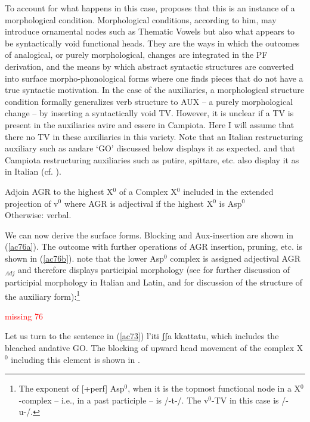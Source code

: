 \documentclass[output=paper]{langscibook}
\begin{document}
{To account for what happens in this case, \cite{calabrese2019a, calabrese2020a} proposes  that this is an instance of a morphological condition. Morphological conditions, according to him, may introduce ornamental nodes such as Thematic Vowels but also what appears to be syntactically void functional heads. They are the ways in which the outcomes of analogical, or purely morphological, changes are integrated in the PF derivation, and the means by which abstract syntactic structures are converted into surface morpho-phonological forms where one finds pieces that do not have a true syntactic motivation. In the case of the auxiliaries, a morphological structure condition formally generalizes verb structure to AUX --  a purely morphological change  --  by inserting a syntactically void TV. However, it is unclear if a TV is present in the auxiliaries avire and essere in Campiota. Here I will assume that there no TV in these auxiliaries in this variety.  Note that an Italian restructuring auxiliary such as andare ‘GO’ discussed below displays it as expected. and that Campiota restructuring auxiliaries such as putire, spittare, etc. also display it as in Italian (cf. ).}

\ea \label{ac75} Adjoin AGR to the highest X$^0$ of a Complex X$^0$ included in the extended projection of v$^0$
    \ea \label{ac75a}where AGR is adjectival if the highest X$^0$ is Asp$^0$\\
        Otherwise:
    \ex \label{ac75b}verbal.
   \z 
\z

We can now derive the surface forms. Blocking and Aux-insertion are shown in (\ref{ac76a}).  The outcome with further operations of AGR insertion, pruning, etc. is shown in (\ref{ac76b}).  note that the lower Asp$^0$ complex is assigned adjectival AGR$_{Adj}$ and therefore displays participial morphology (see \cite{calabrese2020a} for further discussion of participial morphology in Italian and Latin, and \cite{calabrese2019a} for discussion of the structure of the auxiliary form):\footnote{The exponent of [+perf] Asp$^0$, when it is the topmost functional node in a X$^0$-complex -- i.e., in a past participle --  is /-t-/.  The v$^0$-TV in this case is /-u-/.} 


\ea \label{ac76}
\textcolor{red}{missing 76}
    \ea\label{ac76a}
    \ex \label{ac76b}
    \z

\z

Let us turn to the sentence in (\ref{ac73}) l’iti ʃʃa kkattatu, which includes the bleached andative GO.  The blocking of upward head movement of the complex X$^0$ including this element is shown in .
\end{document}
